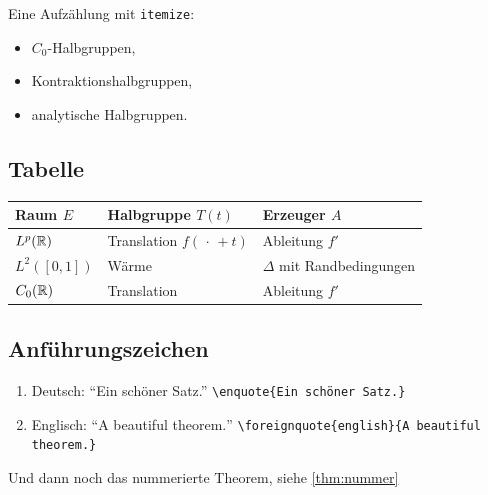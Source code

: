 \begin{refsection}
Eine Aufzählung mit \texttt{itemize}:
\begin{itemize}
    \item $C_0$-Halbgruppen,
    \item Kontraktionshalbgruppen,
    \item analytische Halbgruppen.
\end{itemize}

\subsection*{Tabelle}

\begin{center}
\begin{tabular}{lll}
    \toprule
    Raum $E$ & Halbgruppe $T(t)$ & Erzeuger $A$ \\
    \midrule
    $L^{p}(\mathbb{R})$ & Translation $f(\,\cdot\,+t)$ & Ableitung $f'$ \\
    $L^{2}([0,1])$ & Wärme & $\Delta$ mit Randbedingungen \\
    $C_{0}(\mathbb{R})$ & Translation & Ableitung $f'$ \\
    \bottomrule
\end{tabular}
\end{center}

\subsection*{Anführungszeichen}
\begin{enumerate}[--]

\item
Deutsch: \enquote{Ein schöner Satz.} \verb|\enquote{Ein schöner Satz.}|

\item
Englisch: \foreignquote{english}{A beautiful theorem.} \verb|\foreignquote{english}{A beautiful theorem.}|

\end{enumerate}
Und dann noch das nummerierte Theorem, siehe  \vref{thm:nummer}
\RaggedRight
\printbibliography
\end{refsection}
